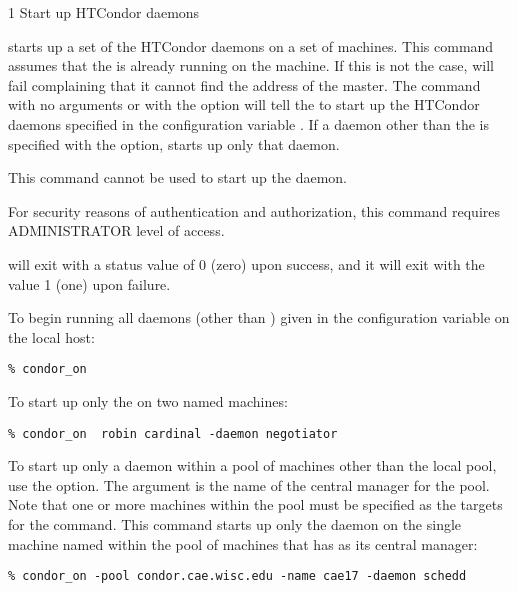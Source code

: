 \begin{ManPage}{\label{man-condor-on}}{1}
{Start up HTCondor daemons}

\Synopsis {}
\ToolArgsBase

\ToolDebugOption
\ToolWhere \ToolArgsAffect

\Description 

 starts up a set of the HTCondor daemons on a set of
machines.
This command assumes that the  is already
running on the machine.
If this is not the case,  will
fail complaining that it cannot find the address of the master.
The command  with no arguments or with
 the  option will
tell the  to start up the HTCondor daemons specified
in the configuration variable .
If a daemon other than the  is specified
with the  option,
 starts up only that daemon.

This command cannot be used to start up the  daemon.

For security reasons of authentication and authorization,
this command requires ADMINISTRATOR level of access.

\begin{Options}
    \ToolArgsBaseDesc
    \ToolDebugDesc
    \ToolArgsLocateDesc
    \ToolArgsAffectDesc
\end{Options}

\ExitStatus

 will exit with a status value of 0 (zero) upon success,
and it will exit with the value 1 (one) upon failure.

\Examples
To begin running all daemons (other than ) given
in the configuration variable 
on the local host:
\begin{verbatim}
% condor_on
\end{verbatim}

To start up only the  on two named machines:
\begin{verbatim}
% condor_on  robin cardinal -daemon negotiator
\end{verbatim}

To start up only a daemon within a pool of machines
other than the local pool, use the  option.
The argument is the name of the central manager for the pool.
Note that one or more machines within the pool must be
specified as the targets for the command.
This command starts up only the  daemon
on the single machine named  within the
pool of machines that has  as
its central manager:
\begin{verbatim}
% condor_on -pool condor.cae.wisc.edu -name cae17 -daemon schedd
\end{verbatim}

\end{ManPage}
